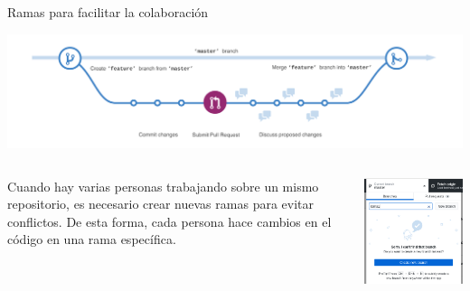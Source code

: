 \documentclass[xcolor={usenames,svgnames,dvipsnames}]{beamer}
\begin{document}
\begin{frame}[label={sec:org91cf1df}]{Ramas para facilitar la colaboración}
\begin{center}
\includegraphics[width=.9\linewidth]{figs/branching.png}
\end{center}

\begin{columns}
\begin{column}{0.6\columnwidth}
Cuando hay varias personas trabajando sobre un mismo repositorio, es necesario crear nuevas ramas para evitar conflictos. De esta forma, cada persona hace cambios en el código en una rama específica.
\end{column}

\begin{column}{0.4\columnwidth}
\begin{center}
\includegraphics[width=.9\linewidth]{figs/nueva_rama_desktop.png}
\end{center}
\end{column}
\end{columns}
\end{frame}
\end{document}
